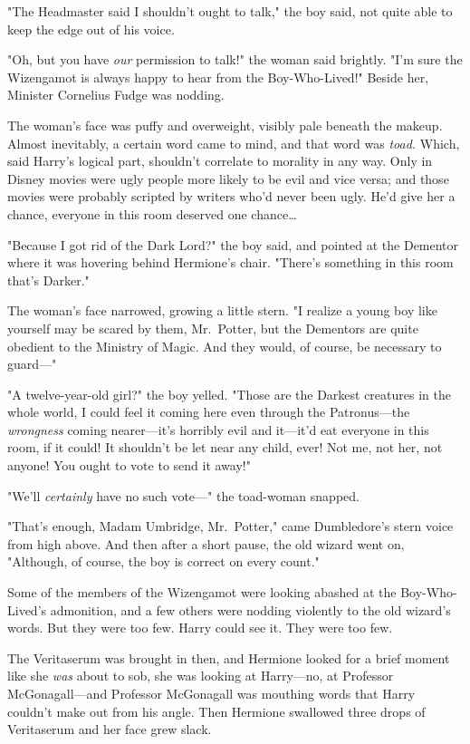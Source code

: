 "The Headmaster said I shouldn't ought to talk," the boy said, not quite able
to keep the edge out of his voice.

"Oh, but you have \emph{our} permission to talk!" the woman said brightly. "I'm
sure the Wizengamot is always happy to hear from the Boy-Who-Lived!" Beside
her, Minister Cornelius Fudge was nodding.

The woman's face was puffy and overweight, visibly pale beneath the makeup.
Almost inevitably, a certain word came to mind, and that word was \emph{toad.}
Which, said Harry's logical part, shouldn't correlate to morality in any way.
Only in Disney movies were ugly people more likely to be evil and vice versa;
and those movies were probably scripted by writers who'd never been ugly. He'd
give her a chance, everyone in this room deserved one chance{\ldots}

"Because I got rid of the Dark Lord?" the boy said, and pointed at the Dementor
where it was hovering behind Hermione's chair. "There's something in this room
that's Darker."

The woman's face narrowed, growing a little stern. "I realize a young boy like
yourself may be scared by them, Mr.~Potter, but the Dementors are quite
obedient to the Ministry of Magic. And they would, of course, be necessary to
guard---"

"A twelve-year-old girl?" the boy yelled. "Those are the Darkest creatures in
the whole world, I could feel it coming here even through the Patronus---the
\emph{wrongness} coming nearer---it's horribly evil and it---it'd eat everyone
in this room, if it could! It shouldn't be let near any child, ever! Not me,
not her, not anyone! You ought to vote to send it away!"

"We'll \emph{certainly} have no such vote---" the toad-woman snapped.

"That's enough, Madam Umbridge, Mr.~Potter," came Dumbledore's stern voice from
high above. And then after a short pause, the old wizard went on, "Although, of
course, the boy is correct on every count."

Some of the members of the Wizengamot were looking abashed at the
Boy-Who-Lived's admonition, and a few others were nodding violently to the old
wizard's words. But they were too few. Harry could see it. They were too few.

The Veritaserum was brought in then, and Hermione looked for a brief moment
like she \emph{was} about to sob, she was looking at Harry---no, at Professor
McGonagall---and Professor McGonagall was mouthing words that Harry couldn't
make out from his angle. Then Hermione swallowed three drops of Veritaserum and
her face grew slack.

